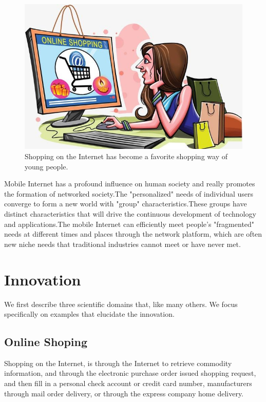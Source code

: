 \documentclass{elsarticle}
\begin{document}
\begin{figure}[ht!]
	\centering
	\includegraphics[trim=0in 0in 0in 0in,clip,width=0.75\columnwidth]{pics/onlineshopping.jpg}
	\caption{Shopping on the Internet has become a favorite shopping way of young people.
		\label{fig:on_shop}}
\end{figure}

Mobile Internet has a profound influence on human society and really promotes the formation of networked society.The "personalized" needs of individual users converge to form a new world with "group" characteristics\cite{SSMSO,DBLP}.These groups have distinct characteristics that will drive the continuous development of technology and applications\cite{extend}.The mobile Internet can efficiently meet people's "fragmented" needs at different times and places through the network platform, which are often new niche needs that traditional industries cannot meet or have never met.

\section{Innovation}\label{sec:inno}
We first describe three scientific domains that, like many others. We 
focus specifically on examples that elucidate the innovation. 

\subsection{Online Shoping}
Shopping on the Internet, is through the Internet to retrieve commodity information, and through the electronic purchase order issued shopping request, and then fill in a personal check account or credit card number, manufacturers through mail order delivery, or through the express company home delivery.
\end{document}
